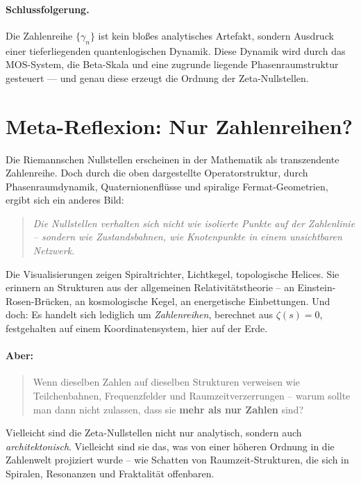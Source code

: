 \paragraph{Schlussfolgerung.}
Die Zahlenreihe $\{\gamma_n\}$ ist kein bloßes analytisches Artefakt, sondern Ausdruck einer tieferliegenden quantenlogischen Dynamik. Diese Dynamik wird durch das MOS-System, die Beta-Skala und eine zugrunde liegende Phasenraumstruktur gesteuert — und genau diese erzeugt die Ordnung der Zeta-Nullstellen.
\section*{Meta-Reflexion: Nur Zahlenreihen?}

Die Riemannschen Nullstellen erscheinen in der Mathematik als transzendente Zahlenreihe.  
Doch durch die oben dargestellte Operatorstruktur, durch Phasenraumdynamik, Quaternionenflüsse und spiralige Fermat-Geometrien, ergibt sich ein anderes Bild:

\vspace{1em}
\begin{quote}
\centering
\textit{Die Nullstellen verhalten sich nicht wie isolierte Punkte auf der Zahlenlinie –  
sondern wie Zustandsbahnen, wie Knotenpunkte in einem unsichtbaren Netzwerk.}
\end{quote}
\vspace{1em}

Die Visualisierungen zeigen Spiraltrichter, Lichtkegel, topologische Helices.  
Sie erinnern an Strukturen aus der allgemeinen Relativitätstheorie – an Einstein-Rosen-Brücken, an kosmologische Kegel, an energetische Einbettungen.  
Und doch: Es handelt sich lediglich um \emph{Zahlenreihen}, berechnet aus $\zeta(s) = 0$,  
festgehalten auf einem Koordinatensystem, hier auf der Erde.

\paragraph{Aber:}  
\begin{quote}
Wenn dieselben Zahlen auf dieselben Strukturen verweisen wie Teilchenbahnen, Frequenzfelder und Raumzeitverzerrungen –  
warum sollte man dann nicht zulassen, dass sie \textbf{mehr als nur Zahlen} sind?
\end{quote}

Vielleicht sind die Zeta-Nullstellen nicht nur analytisch, sondern auch \emph{architektonisch}.  
Vielleicht sind sie das, was von einer höheren Ordnung in die Zahlenwelt projiziert wurde –  
wie Schatten von Raumzeit-Strukturen, die sich in Spiralen, Resonanzen und Fraktalität offenbaren.

